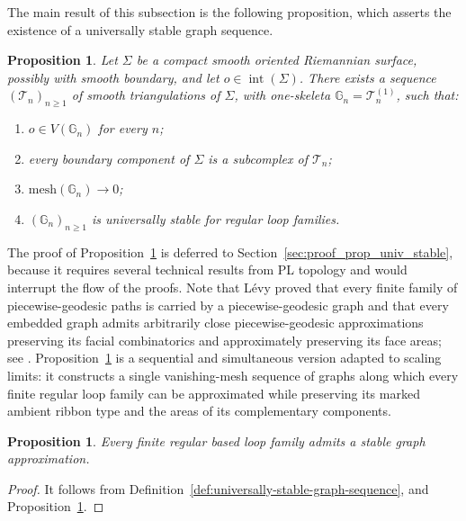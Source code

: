\documentclass[11pt,a4paper,reqno]{article}
\newtheorem{proposition}[theorem]{Proposition}
\theoremstyle{definition}
\theoremstyle{remark}
\newcommand\Gbb{{\mathbb{G}}}
\newcommand\mesh{{\mathrm{mesh}}}
\begin{document}
The main result of this subsection is the following proposition, which asserts the existence of a universally stable graph sequence.

\begin{proposition}\label{prop:existence-universally-stable-sequence}
Let $\Sigma$ be a compact smooth oriented Riemannian surface, possibly with smooth boundary, and let $o\in\operatorname{int}(\Sigma)$. There exists a sequence $(\mathcal T_n)_{n\geq1}$ of smooth triangulations of $\Sigma$, with one-skeleta $\Gbb_n=\mathcal T_n^{(1)}$, such that:
\begin{enumerate}
\item $o\in V(\Gbb_n)$ for every $n$;
\item every boundary component of $\Sigma$ is a subcomplex of $\mathcal T_n$;
\item $\mesh(\Gbb_n)\to0$;
\item $(\Gbb_n)_{n\geq1}$ is universally stable for regular loop families.
\end{enumerate}
\end{proposition}

The proof of Proposition~\ref{prop:existence-universally-stable-sequence} is deferred to Section~\ref{sec:proof_prop_univ_stable}, because it requires several technical results from PL topology and would interrupt the flow of the proofs. Note that L\'evy proved that every finite family of piecewise-geodesic paths is carried by a piecewise-geodesic graph and that every embedded graph admits arbitrarily close piecewise-geodesic approximations preserving its facial combinatorics and approximately preserving its face areas; see \cite[Propositions 1.4.8 and 1.4.10]{Lev10}. Proposition~\ref{prop:existence-universally-stable-sequence} is a sequential and simultaneous version adapted to scaling limits: it constructs a single vanishing-mesh sequence of graphs along which every finite regular loop family can be approximated while preserving its marked ambient ribbon type and the areas of its complementary components.

\begin{proposition}\label{prop:Levy-stable-existence}
Every finite regular based loop family admits a stable graph approximation.
\end{proposition}

\begin{proof}
It follows from Definition~\ref{def:universally-stable-graph-sequence}, and Proposition~\ref{prop:existence-universally-stable-sequence}. 
\end{proof}
\end{document}
